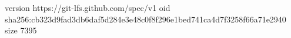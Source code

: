 version https://git-lfs.github.com/spec/v1
oid sha256:cb323d9fad3db6daf5d284e3e48c0f8f296e1bed741ca4d7f3258f66a71e2940
size 7395
